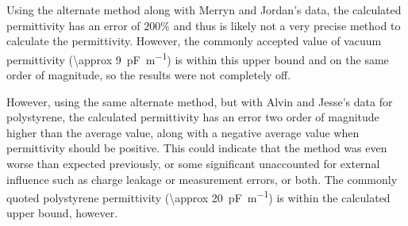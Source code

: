 \documentclass[a4paper]{scrartcl}
\begin{document}
Using the alternate method along with Merryn and Jordan's data, the calculated permittivity has an error of \(200\%\) and thus is likely not a very precise method to calculate the permittivity. However, the commonly accepted value of vacuum permittivity (\SI{\approx 9}{\pico\farad\per\metre}) is within this upper bound and on the same order of magnitude, so the results were not completely off.

However, using the same alternate method, but with Alvin and Jesse's data for polystyrene, the calculated permittivity has an error two order of magnitude higher than the average value, along with a negative average value when permittivity should be positive. This could indicate that the method was even worse than expected previously, or some significant unaccounted for external influence such as charge leakage or measurement errors, or both. The commonly quoted polystyrene permittivity (\SI{\approx 20}{\pico\farad\per\metre}) is within the calculated upper bound, however.
\end{document}
